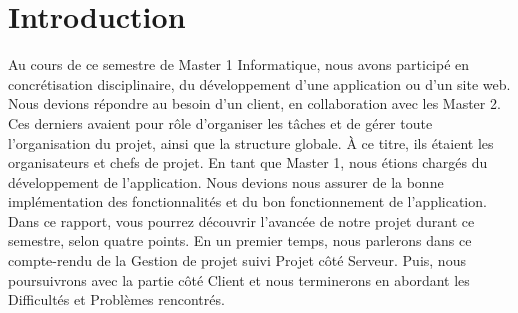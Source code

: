 \chapter*{Introduction}

Au cours de ce semestre de Master 1 Informatique, nous avons participé en concrétisation disciplinaire, du développement d'une application ou d'un site web. Nous devions répondre au besoin d'un client, en collaboration avec les Master 2. Ces derniers avaient pour rôle d'organiser les tâches et de gérer toute l'organisation du projet, ainsi que la structure globale. À ce titre, ils étaient les organisateurs et chefs de projet.
En tant que Master 1, nous étions chargés du développement de l'application. Nous devions nous assurer de la bonne implémentation des fonctionnalités et du  bon fonctionnement de l'application.
Dans ce rapport, vous pourrez découvrir l'avancée de notre projet durant ce semestre, selon quatre points. En un premier temps, nous parlerons dans ce compte-rendu de la Gestion de projet suivi Projet côté Serveur. Puis, nous poursuivrons avec la partie côté Client et nous terminerons en abordant les Difficultés et Problèmes rencontrés.


